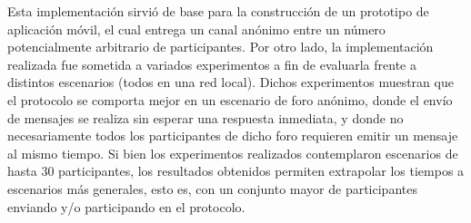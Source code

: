 Esta implementaci\'on sirvi\'o de base para la construcción de un 
prototipo de aplicación móvil, el cual entrega un 
canal anónimo entre un número potencialmente arbitrario de participantes. 
Por otro lado, la implementación realizada fue sometida a 
variados experimentos a fin de evaluarla frente a distintos escenarios 
(todos en una red local).
Dichos experimentos muestran que el protocolo se comporta mejor 
en un escenario de foro anónimo, donde el envío de mensajes 
se realiza sin esperar una respuesta inmediata, y donde no necesariamente
todos los participantes de dicho foro requieren emitir un 
mensaje al mismo tiempo. Si bien los experimentos realizados contemplaron
escenarios de hasta 30 participantes, los resultados obtenidos permiten extrapolar los
tiempos a escenarios más generales, esto es, con un conjunto mayor 
de participantes enviando y/o participando en el protocolo. 